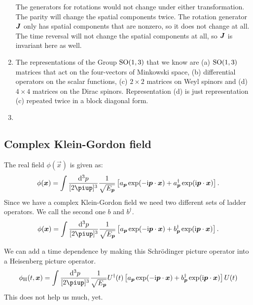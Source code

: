 \documentclass[11pt, english, fleqn, DIV=15, headinclude, BCOR=1cm]{scrartcl}
\begin{document}
\begin{enumerate}
        The generators for rotations would not change under either
        transformation. The parity will change the spatial components twice.
        The rotation generator $\mat J$ only has spatial components that are
        nonzero, so it does not change at all. The time reversal will not
        change the spatial components at all, so $\mat J$ is invariant here as
        well. 

    \item
        The representations of the Group $\mathrm{SO}(1, 3)$ that we know are (a)
        $\mathrm{SO}(1, 3)$ matrices that act on the four-vectors of Minkowski space,
        (b) differential operators on the scalar functions, (c) $2 \times 2$
        matrices on Weyl spinors and (d) $4 \times 4$ matrices on the Dirac
        spinors. Representation (d) is just representation (c) repeated twice
        in a block diagonal form.


    \item
\end{enumerate}

\subsection{Complex Klein-Gordon field}

The real field $\phi(\vec x)$ is given as:
\[
    \phi(\vec x) = \int \frac{\dif^3 p}{[2\piup]^3} \frac{1}{\sqrt{E_{\vec p}}}
    \sbr{
        a_{\vec p} \exp(- \iup \vec p \cdot \vec x)
        + a_{\vec p}^\dagger \exp(\iup \vec p \cdot \vec x)
    }.
\]
Since we have a complex Klein-Gordon field we need two different sets of ladder
operators. We call the second one $b$ and $b^\dagger$.
\[
    \phi(\vec x) = \int \frac{\dif^3 p}{[2\piup]^3} \frac{1}{\sqrt{E_{\vec p}}}
    \sbr{
        a_{\vec p} \exp(- \iup \vec p \cdot \vec x)
        + b_{\vec p}^\dagger \exp(\iup \vec p \cdot \vec x)
    }.
\]

We can add a time dependence by making this Schrödinger picture operator into a
Heisenberg picture operator.
\[
    \phi_\mathrm H(t, \vec x) = \int \frac{\dif^3 p}{[2\piup]^3} \frac{1}{\sqrt{E_{\vec p}}}
    U^\dagger(t) \sbr{
        a_{\vec p} \exp(- \iup \vec p \cdot \vec x)
        + b_{\vec p}^\dagger \exp(\iup \vec p \cdot \vec x)
    } U(t)
\]
This does not help us much, yet.
\end{document}
